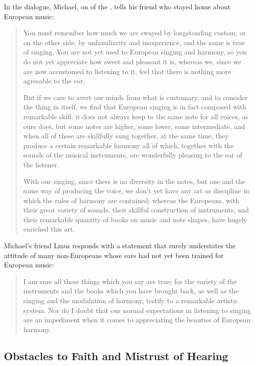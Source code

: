 In the dialogue, Michael, on of the , tells his friend who stayed home about European music:
\begin{quotation}
    You must remember \Dots{} how much we are swayed by longstanding custom, or on the other side, by unfamiliarity and inexperience, and the same is true of singing. 
    You are not yet used to European singing and harmony, so you do not yet appreciate how sweet and pleasant it is, whereas we, since we are now accustomed to listening to it, feel that there is nothing more agreeable to the ear.

    But if we care to avert our minds from what is customary, and to consider the thing in itself, we find that European singing is in fact composed with remarkable skill; it does not always keep to the same note for all voices, as ours does, but some notes are higher, some lower, some intermediate, and when all of these are skillfully sung together, at the same time, they produce a certain remarkable harmony \Dots{} all of which, \Dots{} together with the sounds of the musical instruments, are wonderfully pleasing to the ear of the listener. \Dots{}

    With our singing, since there is no diversity in the notes, but one and the same way of producing the voice, we don't yet have any art or discipline in which the rules of harmony are contained; whereas the Europeans, with their great variety of sounds, their skillful construction of instruments, and their remarkable quantity of books on music and note shapes, have hugely enriched this art.%
         \Autocite[155-156]{Massarella:JapaneseTravellers}
\end{quotation}
Michael's friend Linus responds with a statement that surely understates the attitude of many non-Europeans whose ears had not yet been trained for European music:
\begin{quote}
    I am sure all these things which you say are true; for the variety of the instruments and the books which you have brought back, as well as the singing and the modulation of harmony, testify to a remarkable artistic system.
    Nor do I doubt that our normal expectations in listening to singing are an impediment when it comes to appreciating the beauties of European harmony.%
         \Autocite[156]{Massarella:JapaneseTravellers}
\end{quote}



\subsection{Obstacles to Faith and Mistrust of Hearing}

